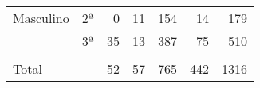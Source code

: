 \documentclass[12pt]{article}   %
\begin{document}
\begin{table}[h!]
\begin{tabular}{lc|rrrr|r}
Masculino & 2ª                    & \multicolumn{1}{r|}{0}      & \multicolumn{1}{r|}{11}        & \multicolumn{1}{r|}{154}    & 14                              & 179                       \\
            & 3ª                    & \multicolumn{1}{r|}{35}     & \multicolumn{1}{r|}{13}        & \multicolumn{1}{r|}{387}    & 75                              & 510                       \\
            &                       & \multicolumn{1}{c|}{}       & \multicolumn{1}{c|}{}          & \multicolumn{1}{c|}{}       & \multicolumn{1}{c|}{}           & \multicolumn{1}{c}{}      \\ \hline
Total     &                       & \multicolumn{1}{r|}{52}     & \multicolumn{1}{r|}{57}        & \multicolumn{1}{r|}{765}    & 442                             & 1316                      \\ \hline
\end{tabular}
\end{table}
\end{document}
